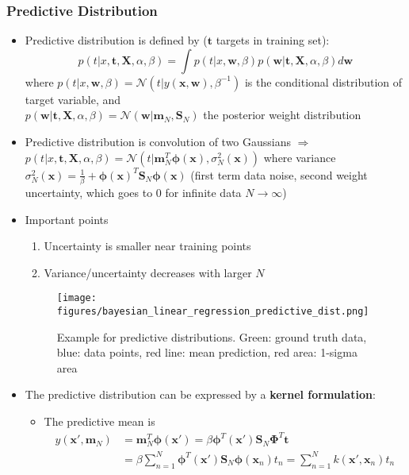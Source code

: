 \subsubsection{Predictive Distribution}
\begin{itemize}
	\item Predictive distribution is defined by ($\bm{t}$ targets in training set):
	$$p\left(t|x, \bm{t}, \bm{X}, \alpha, \beta \right) = \int p\left(t|x, \bm{w},\beta\right)p\left(\bm{w}|\bm{t}, \bm{X}, \alpha, \beta\right)d\bm{w}$$
	where $p\left(t|x, \bm{w},\beta\right) = \mathcal{N}\left(t|y\left(\bm{x},\bm{w}\right), \beta^{-1}\right)$ is the conditional distribution of target variable, and \\$p\left(\bm{w}|\bm{t}, \bm{X}, \alpha, \beta\right) = \mathcal{N}\left(\bm{w}|\bm{m}_N, \bm{S}_N\right)$ the posterior weight distribution
	\item Predictive distribution is convolution of two Gaussians $\Rightarrow$ $p\left(t|x, \bm{t}, \bm{X}, \alpha, \beta \right)=\mathcal{N}\left(t|\bm{m}_N^{T}\bm{\phi}(\bm{x}),\sigma_N^2(\bm{x}) \right)$
	where variance $\sigma_N^2(\bm{x})=\frac{1}{\beta} + \bm{\phi}(\bm{x})^T \bm{S}_N \bm{\phi}(\bm{x})$ (first term data noise, second weight uncertainty, which goes to 0 for infinite data $N\to\infty$)
	\item Important points
	\begin{enumerate}
		\item Uncertainty is smaller near training points
		\item Variance/uncertainty decreases with larger $N$
	\end{enumerate}
	\begin{figure}[ht]
		\centering
		\texttt{[image: figures/bayesian\_linear\_regression\_predictive\_dist.png]}
		\caption{Example for predictive distributions. Green: ground truth data, blue: data points, red line: mean prediction, red area: 1-sigma area}
	\end{figure}
	\item The predictive distribution can be expressed by a \textbf{kernel formulation}:
	\begin{itemize}
		\item The predictive mean is 
		\begin{equation*}
		\begin{split}
			y\left(\bm{x}', \bm{m}_N\right) & = \bm{m}_N^T \bm{\phi}(\bm{x}') = \beta \bm{\phi}^T(\bm{x}')\bm{S}_N \bm{\Phi}^T \bm{t}\\
			& = \beta \sum\limits_{n=1}^{N} \bm{\phi}^T(\bm{x}')\bm{S}_N \bm{\phi}(\bm{x}_n) t_n = \sum\limits_{n=1}^{N} k\left(\bm{x}',\bm{x}_n\right) t_n \\ &\text{ 
}
\end{split}
\end{equation*}
\end{itemize}
\end{itemize}
